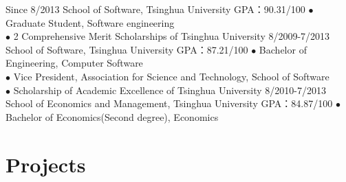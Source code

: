 \documentclass[]{friggeri-cv}
\begin{document}
\begin{entrylist}
  \entry
    {Since 8/2013}
    {School of Software, Tsinghua University}
    {GPA：90.31/100}
    {$\bullet$ Graduate Student, Software engineering \\
    $\bullet$ 2 Comprehensive Merit Scholarships of Tsinghua University
    }
  \entry
    {8/2009-7/2013}
    {School of Software, Tsinghua University}
    {GPA：87.21/100}
    {$\bullet$ Bachelor of Engineering, Computer Software \\
    $\bullet$ Vice President, Association for Science and Technology, School of Software\\
    $\bullet$ Scholarship of Academic Excellence of Tsinghua University 
    }
  \entry
    {8/2010-7/2013}
    {School of Economics and Management, Tsinghua University}
    {GPA：84.87/100}
    {$\bullet$ Bachelor of Economics(Second degree), Economics}
\end{entrylist}

\section{Projects}
\end{document}
